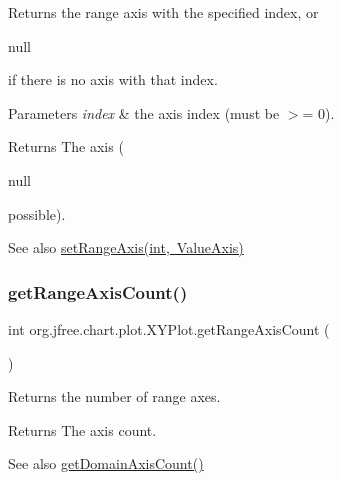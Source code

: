 Returns the range axis with the specified index, or
\begin{DoxyCode}
null 
\end{DoxyCode}
 if there is no axis with that index.


\begin{DoxyParams}{Parameters}
{\em index} & the axis index (must be $>$= 0).\\
\hline
\end{DoxyParams}
\begin{DoxyReturn}{Returns}
The axis (
\begin{DoxyCode}
null 
\end{DoxyCode}
 possible).
\end{DoxyReturn}
\begin{DoxySeeAlso}{See also}
\mbox{\hyperlink{classorg_1_1jfree_1_1chart_1_1plot_1_1_x_y_plot_adf8ca4d952a2871070c70d1dca674ec6}{set\+Range\+Axis(int, Value\+Axis)}} 
\end{DoxySeeAlso}
\mbox{\label{classorg_1_1jfree_1_1chart_1_1plot_1_1_x_y_plot_aa5e28a20e931bcf9df88489edad70aa5}} 
\subsubsection{\texorpdfstring{get\+Range\+Axis\+Count()}{getRangeAxisCount()}}
{\footnotesize\ttfamily int org.\+jfree.\+chart.\+plot.\+X\+Y\+Plot.\+get\+Range\+Axis\+Count (\begin{DoxyParamCaption}{ }\end{DoxyParamCaption})}

Returns the number of range axes.

\begin{DoxyReturn}{Returns}
The axis count.
\end{DoxyReturn}
\begin{DoxySeeAlso}{See also}
\mbox{\hyperlink{classorg_1_1jfree_1_1chart_1_1plot_1_1_x_y_plot_a31f7f2673e1f39e5d1099252e2068076}{get\+Domain\+Axis\+Count()}} 
\end{DoxySeeAlso}
\mbox{\label{classorg_1_1jfree_1_1chart_1_1plot_1_1_x_y_plot_afedfdcd95acbad44c695f54697beeb09}} 
